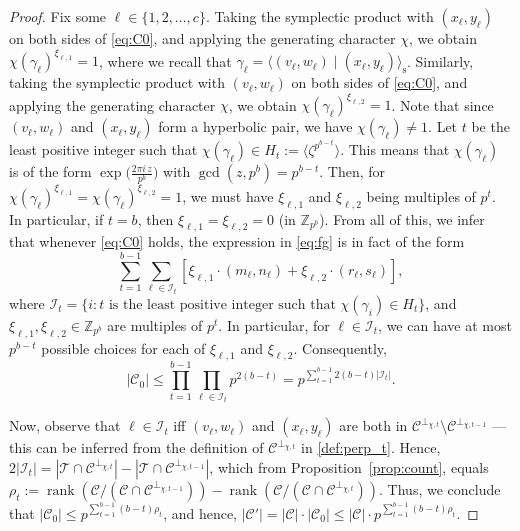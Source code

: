 \documentclass{article}
\DeclareMathOperator{\rank}{rank}
\theoremstyle{remark}
\theoremstyle{definition}
\numberwithin{equation}{section}
\begin{document}
\begin{proof}
Fix some $\ell \in \{1,2,\ldots,c\}$. Taking the symplectic product with $(x_{\ell},y_{\ell})$ on both sides of \eqref{eq:C0}, and applying the generating character $\chi$, we obtain ${\chi(\gamma_\ell)}^{\xi_{\ell,1}} = 1$, where we recall that $\gamma_\ell = \langle(v_\ell,w_\ell) \mid (x_\ell,y_\ell)\rangle_{\mathrm{s}}$. Similarly, taking the symplectic product with $(v_{\ell},w_{\ell})$ on both sides of \eqref{eq:C0}, and applying the generating character $\chi$, we obtain ${\chi(\gamma_\ell)}^{\xi_{\ell,2}} = 1$. Note that since $(v_{\ell},w_{\ell})$ and $(x_{\ell},y_{\ell})$ form a hyperbolic pair, we have $\chi(\gamma_\ell) \neq 1$. Let $t$ be the least positive integer such that $\chi(\gamma_\ell) \in H_t := \langle \zeta^{p^{b-t}} \rangle$. This means that $\chi(\gamma_\ell)$ is of the form $\exp\bigl(\frac{2\pi i \, z}{p^b}\bigr)$ with $\gcd(z,p^b) = p^{b-t}$. Then, for ${\chi(\gamma_\ell)}^{\xi_{\ell,1}} = {\chi(\gamma_\ell)}^{\xi_{\ell,2}} = 1$, we must have $\xi_{\ell,1}$ and $\xi_{\ell,2}$ being multiples of $p^t$. In particular, if $t=b$, then $\xi_{\ell,1}=\xi_{\ell,2}=0$ (in $\mathbb{Z}_{p^b}$). From all of this, we infer that whenever \eqref{eq:C0} holds, the expression in \eqref{eq:fg} is in fact of the form 
\begin{equation*}
\sum_{t = 1}^{b-1} \sum_{\ell \in \mathcal{I}_t}  [\xi_{\ell,1} \cdot (m_\ell,n_\ell) + \xi_{\ell,2} \cdot (r_\ell,s_\ell)],
\end{equation*}
where $\mathcal{I}_t = \{i : \text{$t$ is the least positive integer such that $\chi(\gamma_i) \in H_t$}\}$, and $\xi_{\ell,1},\xi_{\ell,2} \in \mathbb{Z}_{p^b}$ are multiples of $p^t$. In particular, for $\ell \in \mathcal{I}_t$, we can have at most $p^{b-t}$ possible choices for each of $\xi_{\ell,1}$ and $\xi_{\ell,2}$. Consequently, 
$$
|\mathcal{C}_0| \le \prod_{t=1}^{b-1} \prod_{\ell \in \mathcal{I}_t} p^{2(b-t)} = p^{\sum_{t=1}^{b-1} 2(b-t)|\mathcal{I}_t|}.
$$

Now, observe that $\ell \in \mathcal{I}_t$ iff $(v_{\ell},w_{\ell})$ and $(x_\ell,y_\ell)$ are both in $\mathcal{C}^{\perp_{\chi,t}} \setminus \mathcal{C}^{\perp_{\chi,t-1}}$ --- this can be inferred from the definition of $\mathcal{C}^{\perp_{\chi,t}}$ in \eqref{def:perp_t}. Hence, $2|\mathcal{I}_t| = \left|\mathcal{T} \cap \mathcal{C}^{\perp_{\chi,t}} \right| - \left|\mathcal{T} \cap \mathcal{C}^{\perp_{\chi,t-1}} \right|$, which from Proposition~\ref{prop:count}, equals $\rho_t := \rank(\mathcal{C}/(\mathcal{C} \cap \mathcal{C}^{\perp_{\chi,t-1}}))-\rank(\mathcal{C}/(\mathcal{C} \cap \mathcal{C}^{\perp_{\chi,t}}))$. Thus, we conclude that $|\mathcal{C}_0| \le p^{\sum_{t=1}^{b-1} (b-t) \rho_t}$, and hence, $|\mathcal{C}'| = |\mathcal{C}|\cdot |\mathcal{C}_0|  \le |\mathcal{C}| \cdot p^{\sum_{t=1}^{b-1} (b-t) \rho_t}$.


\end{proof}
\end{document}
